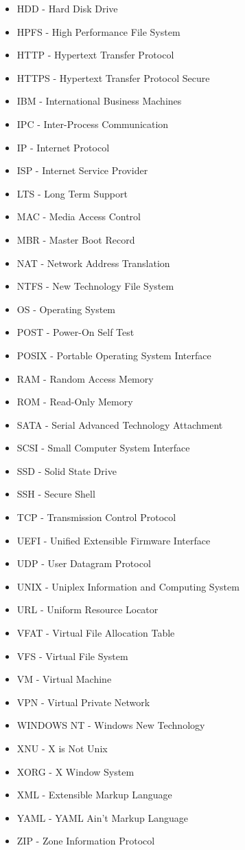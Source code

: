 \documentclass[11pt,twoside]{book}
\begin{document}
\begin{itemize}
\item HDD - Hard Disk Drive
\item HPFS - High Performance File System
\item HTTP - Hypertext Transfer Protocol
\item HTTPS - Hypertext Transfer Protocol Secure
\item IBM - International Business Machines
\item IPC - Inter-Process Communication
\item IP - Internet Protocol
\item ISP - Internet Service Provider
\item LTS - Long Term Support
\item MAC - Media Access Control
\item MBR - Master Boot Record
\item NAT - Network Address Translation
\item NTFS - New Technology File System
\item OS - Operating System
\item POST - Power-On Self Test
\item POSIX - Portable Operating System Interface
\item RAM - Random Access Memory
\item ROM - Read-Only Memory
\item SATA - Serial Advanced Technology Attachment
\item SCSI - Small Computer System Interface
\item SSD - Solid State Drive
\item SSH - Secure Shell
\item TCP - Transmission Control Protocol
\item UEFI - Unified Extensible Firmware Interface
\item UDP - User Datagram Protocol
\item UNIX - Uniplex Information and Computing System
\item URL - Uniform Resource Locator
\item VFAT - Virtual File Allocation Table
\item VFS - Virtual File System
\item VM - Virtual Machine
\item VPN - Virtual Private Network
\item WINDOWS NT - Windows New Technology
\item XNU - X is Not Unix
\item XORG - X Window System
\item XML - Extensible Markup Language
\item YAML - YAML Ain't Markup Language
\item ZIP - Zone Information Protocol
\end{itemize} 
\end{document}
